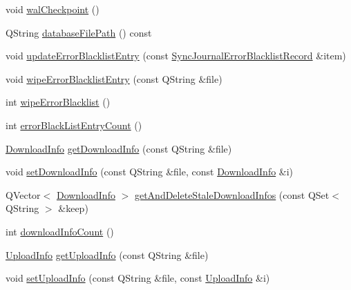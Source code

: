 \begin{DoxyCompactItemize}
\item 
void \hyperlink{class_o_c_c_1_1_sync_journal_db_a30d98508c16ced8a1ea460df3e54194c}{wal\+Checkpoint} ()
\item 
Q\+String \hyperlink{class_o_c_c_1_1_sync_journal_db_a3dd0360e8746b45637c1272ee53a775c}{database\+File\+Path} () const
\item 
void \hyperlink{class_o_c_c_1_1_sync_journal_db_a0781a2d4c5bb4dae808669d5a9fa4c87}{update\+Error\+Blacklist\+Entry} (const \hyperlink{class_o_c_c_1_1_sync_journal_error_blacklist_record}{Sync\+Journal\+Error\+Blacklist\+Record} \&item)
\item 
void \hyperlink{class_o_c_c_1_1_sync_journal_db_acc9083fdf5df19c2ed20f1bc8f907e78}{wipe\+Error\+Blacklist\+Entry} (const Q\+String \&file)
\item 
int \hyperlink{class_o_c_c_1_1_sync_journal_db_a7e0b5118926f33ed5cf4d4774a7c820d}{wipe\+Error\+Blacklist} ()
\item 
int \hyperlink{class_o_c_c_1_1_sync_journal_db_ad805febce9478b797ae3b7ba3fb8e15c}{error\+Black\+List\+Entry\+Count} ()
\item 
\hyperlink{struct_o_c_c_1_1_sync_journal_db_1_1_download_info}{Download\+Info} \hyperlink{class_o_c_c_1_1_sync_journal_db_aa90392931d3abcb21044a64edaa412f8}{get\+Download\+Info} (const Q\+String \&file)
\item 
void \hyperlink{class_o_c_c_1_1_sync_journal_db_ae9abb5e0f59f6df27f42153cd1df6944}{set\+Download\+Info} (const Q\+String \&file, const \hyperlink{struct_o_c_c_1_1_sync_journal_db_1_1_download_info}{Download\+Info} \&i)
\item 
Q\+Vector$<$ \hyperlink{struct_o_c_c_1_1_sync_journal_db_1_1_download_info}{Download\+Info} $>$ \hyperlink{class_o_c_c_1_1_sync_journal_db_aff78b5f83a2f1947a4efb15b3a57df42}{get\+And\+Delete\+Stale\+Download\+Infos} (const Q\+Set$<$ Q\+String $>$ \&keep)
\item 
int \hyperlink{class_o_c_c_1_1_sync_journal_db_ab1dbe87c365d82791623d51fb022ac68}{download\+Info\+Count} ()
\item 
\hyperlink{struct_o_c_c_1_1_sync_journal_db_1_1_upload_info}{Upload\+Info} \hyperlink{class_o_c_c_1_1_sync_journal_db_a290ee947b52ca710308adaa59441c95d}{get\+Upload\+Info} (const Q\+String \&file)
\item 
void \hyperlink{class_o_c_c_1_1_sync_journal_db_a7a5b11baa13b62617fe72bacaf07b0bc}{set\+Upload\+Info} (const Q\+String \&file, const \hyperlink{struct_o_c_c_1_1_sync_journal_db_1_1_upload_info}{Upload\+Info} \&i)
\item 

\end{DoxyCompactItemize}
